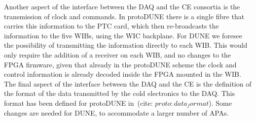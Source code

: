 Another aspect of the interface between the DAQ and the CE consortia is the
transmission of clock and commands. In protoDUNE there is a single fibre
that carries this information to the PTC card, which then re-broadcasts
the information to the five WIBs, using the WIC backplane. For DUNE we
foresee the possibility of transmitting the information directly to each
WIB. This would only require the addition of a receiver on each WIB, and
no changes to the FPGA firmware, given that already in the protoDUNE scheme
the clock and control information is already decoded inside the FPGA mounted
in the WIB. The final aspect of the interface between the DAQ and the CE is
the definition of the format of the data transmitted by the cold electronics
to the DAQ. This format has been defined for protoDUNE in~(cite: $proto:data_format$).
Some changes are needed for DUNE, to accommodate a larger number of APAs.

